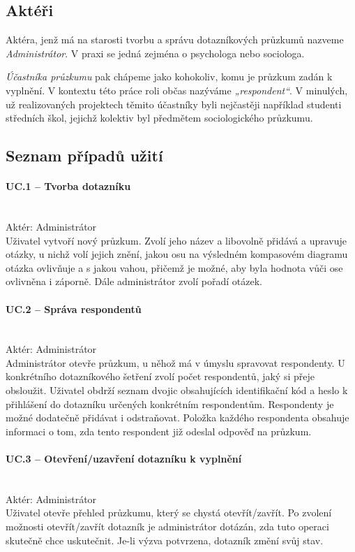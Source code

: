 \subsection{Aktéři}
Aktéra, jenž má na starosti tvorbu a správu dotazníkových průzkumů nazveme \textit{Administrátor}. V praxi se jedná zejména o psychologa nebo sociologa.

\textit{Účastníka průzkumu} pak chápeme jako kohokoliv, komu je průzkum zadán k vyplnění. V kontextu této práce roli občas nazýváme \textit{„respondent“}. V minulých, už realizovaných projektech těmito účastníky byli nejčastěji například studenti středních škol, jejichž kolektiv byl předmětem sociologického průzkumu.

\subsection{Seznam případů užití}
\paragraph{UC.1 – Tvorba dotazníku}~\\
Aktér: Administrátor~\\
Uživatel vytvoří nový průzkum. Zvolí jeho název a libovolně přidává a upravuje otázky, u nichž volí jejich znění, jakou osu na výsledném kompasovém diagramu otázka ovlivňuje a s jakou vahou, přičemž je možné, aby byla hodnota vůči ose ovlivněna i záporně. Dále administrátor zvolí pořadí otázek.

\paragraph{UC.2 – Správa respondentů}~\\
Aktér: Administrátor~\\
Administrátor otevře průzkum, u něhož má v úmyslu spravovat respondenty. U konkrétního dotazníkového šetření zvolí počet respondentů, jaký si přeje obsloužit. Uživatel obdrží seznam dvojic obsahujících identifikační kód a heslo k přihlášení do dotazníku určených konkrétním respondentům. Respondenty je možné dodatečně přidávat i odstraňovat. Položka každého respondenta obsahuje informaci o tom, zda tento respondent již odeslal odpověď na průzkum.

\paragraph{UC.3 – Otevření/uzavření dotazníku k vyplnění}~\\
Aktér: Administrátor~\\
Uživatel otevře přehled průzkumu, který se chystá otevřít/zavřít. Po zvolení možnosti otevřít/zavřít dotazník je administrátor dotázán, zda tuto operaci skutečně chce uskutečnit. Je-li výzva potvrzena, dotazník změní svůj stav.

